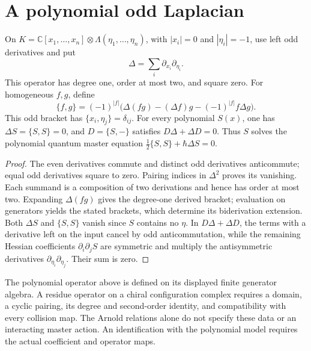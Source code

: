 \section{A polynomial odd Laplacian}

\begin{proposition}
\label{prop:cbc26-polynomial-laplacian}
On $K=\mathbb C[x_1,\ldots,x_n]\otimes\Lambda(\eta_1,\ldots,\eta_n)$, with $|x_i|=0$ and $|\eta_i|=-1$, use left odd derivatives and put
\[
 \Delta=\sum_i\partial_{x_i}\partial_{\eta_i}.
\]
This operator has degree one, order at most two, and square zero.
For homogeneous $f,g$, define
\[
 \{f,g\}=(-1)^{|f|}\bigl(\Delta(fg)-(\Delta f)g-(-1)^{|f|}f\Delta g\bigr).
\]
This odd bracket has $\{x_i,\eta_j\}=\delta_{ij}$.
For every polynomial $S(x)$, one has $\Delta S=\{S,S\}=0$, and $D=\{S,-\}$ satisfies $D\Delta+\Delta D=0$.
Thus $S$ solves the polynomial quantum master equation $\tfrac12\{S,S\}+\hbar\Delta S=0$.
\end{proposition}
\begin{proof}
The even derivatives commute and distinct odd derivatives anticommute; equal odd derivatives square to zero.
Pairing indices in $\Delta^2$ proves its vanishing.
Each summand is a composition of two derivations and hence has order at most two.
Expanding $\Delta(fg)$ gives the degree-one derived bracket; evaluation on generators yields the stated brackets, which determine its biderivation extension.
Both $\Delta S$ and $\{S,S\}$ vanish since $S$ contains no $\eta$.
In $D\Delta+\Delta D$, the terms with a derivative left on the input cancel by odd anticommutation, while the remaining Hessian coefficients $\partial_i\partial_jS$ are symmetric and multiply the antisymmetric derivatives $\partial_{\eta_i}\partial_{\eta_j}$.
Their sum is zero.
\end{proof}

\begin{remark}\label{thm:bv-structure-bar}
The polynomial operator above is defined on its displayed finite generator algebra.
A residue operator on a chiral configuration complex requires a domain, a cyclic pairing, its degree and second-order identity, and compatibility with every collision map.
The Arnold relations alone do not specify these data or an interacting master action.
An identification with the polynomial model requires the actual coefficient and operator maps.
\end{remark}
